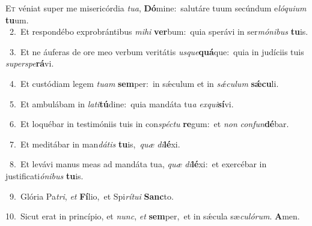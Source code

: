 \lettrine{\initial\textcolor{\initialcolor}{E}}{t} véniat super me misericórdia \textit{tu}\-\textit{a}, \textbf{Dó}\-mine:~\star salutáre tuum secúndum e\-\textit{ló}\-\textit{qui}\textit{um} \textbf{tu}\-um.\\
{\numbfont\textcolor{\numbcolor}{~2.}}~Et respondébo exprobrántibus \textit{mi}\-\textit{hi} \textbf{ver}\-bum:~\star quia sperávi in ser\-\textit{mó}\-\textit{ni}\textit{bus} \textbf{tu}\-is.\par
{\numbfont\textcolor{\numbcolor}{~3.}}~Et ne áuferas de ore meo verbum veritátis \textit{us}\-\textit{que}\textbf{quá}que:~\star quia in judíciis tuis \textit{su}\-\textit{per}\textit{spe}\textbf{rá}vi.\par
{\numbfont\textcolor{\numbcolor}{~4.}}~Et custódiam legem \textit{tu}\-\textit{am} \textbf{sem}\-per:~\star in sǽculum et in \textit{sǽ}\-\textit{cu}\textit{lum} \textbf{sǽ}\-\textbf{cu}li.\par
{\numbfont\textcolor{\numbcolor}{~5.}}~Et ambulábam in \textit{la}\-\textit{ti}\textbf{tú}dine:~\star quia mandáta tu\textit{a} \textit{ex}\-\textit{qui}\textbf{sí}vi.\par
{\numbfont\textcolor{\numbcolor}{~6.}}~Et loquébar in testimóniis tuis in con\-\textit{spéc}\-\textit{tu} \textbf{re}\-gum:~\star et \textit{non} \textit{con}\-\textit{fun}\textbf{dé}bar.\par
{\numbfont\textcolor{\numbcolor}{~7.}}~Et meditábar in man\-\textit{dá}\-\textit{tis} \textbf{tu}\-is,~\star \textit{quæ} \textit{di}\-\textbf{lé}xi.\par
{\numbfont\textcolor{\numbcolor}{~8.}}~Et levávi manus meas ad mandáta tua, \textit{quæ} \textit{di}\-\textbf{lé}xi:~\star et exercébar in justificati\-\textit{ó}\-\textit{ni}\textit{bus} \textbf{tu}\-is.\par
{\numbfont\textcolor{\numbcolor}{~9.}}~Glória Pa\-\textit{tri}\-, \textit{et} \textbf{Fí}\-lio,~\star et Spi\-\textit{rí}\-\textit{tu}\textit{i} \textbf{Sanc}\-to.\par
{\numbfont\textcolor{\numbcolor}{10.}}~Sicut erat in princípio, et \textit{nunc}\-, \textit{et} \textbf{sem}\-per,~\star et in sǽcula sæ\-\textit{cu}\-\textit{ló}\textit{rum}. \textbf{A}\-men.\par
